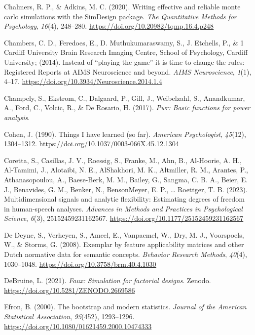 \documentclass[
  man]{apa7}
\newlength{\cslhangindent}
\newenvironment{CSLReferences}[2] %
 {\begin{list}{}{%
  \setlength{\itemindent}{0pt}
  \setlength{\leftmargin}{0pt}
  \setlength{\parsep}{0pt}
  \ifodd #1
   \setlength{\leftmargin}{\cslhangindent}
   \setlength{\itemindent}{-1\cslhangindent}
  \fi
  \setlength{\itemsep}{#2\baselineskip}}}
 {\end{list}}
\begin{document}
\begin{CSLReferences}{1}{0}
Chalmers, R. P., \& Adkins, M. C. (2020). Writing effective and reliable monte carlo simulations with the SimDesign package. \emph{The Quantitative Methods for Psychology}, \emph{16}(4), 248--280. \url{https://doi.org/10.20982/tqmp.16.4.p248}

Chambers, C. D., Feredoes, E., D. Muthukumaraswamy, S., J. Etchells, P., \& 1 Cardiff University Brain Research Imaging Centre, School of Psychology, Cardiff University; (2014). Instead of {``}playing the game{''} it is time to change the rules: Registered Reports at AIMS Neuroscience and beyond. \emph{AIMS Neuroscience}, \emph{1}(1), 4--17. \url{https://doi.org/10.3934/Neuroscience.2014.1.4}

Champely, S., Ekstrom, C., Dalgaard, P., Gill, J., Weibelzahl, S., Anandkumar, A., Ford, C., Volcic, R., \& De Rosario, H. (2017). \emph{Pwr: Basic functions for power analysis}.

Cohen, J. (1990). Things I have learned (so far). \emph{American Psychologist}, \emph{45}(12), 1304--1312. \url{https://doi.org/10.1037/0003-066X.45.12.1304}

Coretta, S., Casillas, J. V., Roessig, S., Franke, M., Ahn, B., Al-Hoorie, A. H., Al-Tamimi, J., Alotaibi, N. E., AlShakhori, M. K., Altmiller, R. M., Arantes, P., Athanasopoulou, A., Baese-Berk, M. M., Bailey, G., Sangma, C. B. A., Beier, E. J., Benavides, G. M., Benker, N., BensonMeyer, E. P., \ldots{} Roettger, T. B. (2023). Multidimensional signals and analytic flexibility: Estimating degrees of freedom in human-speech analyses. \emph{Advances in Methods and Practices in Psychological Science}, \emph{6}(3), 25152459231162567. \url{https://doi.org/10.1177/25152459231162567}

De Deyne, S., Verheyen, S., Ameel, E., Vanpaemel, W., Dry, M. J., Voorspoels, W., \& Storms, G. (2008). Exemplar by feature applicability matrices and other Dutch normative data for semantic concepts. \emph{Behavior Research Methods}, \emph{40}(4), 1030--1048. \url{https://doi.org/10.3758/brm.40.4.1030}

DeBruine, L. (2021). \emph{Faux: Simulation for factorial designs}. Zenodo. \url{https://doi.org/10.5281/ZENODO.2669586}

Efron, B. (2000). The bootstrap and modern statistics. \emph{Journal of the American Statistical Association}, \emph{95}(452), 1293--1296. \url{https://doi.org/10.1080/01621459.2000.10474333}


\end{CSLReferences}
\end{document}
